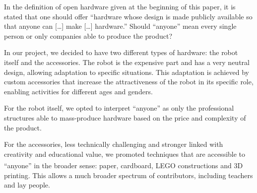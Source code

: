 \documentclass[letterpaper, 10 pt, conference]{ieeeconf}  %
\begin{document}
In the definition of open hardware given at the beginning of this paper, it is stated that one should offer ``hardware whose design is made publicly available so that anyone can [\dots] make [\dots] hardware.''
Should ``anyone'' mean every single person or only companies able to produce the product?

In our project, we decided to have two different types of hardware: the robot itself and the accessories. %
The robot is the expensive part and has a very neutral design, allowing adaptation to specific situations.
This adaptation is achieved by custom accessories that increase the attractiveness of the robot in its specific role, enabling activities for different ages and genders.

For the robot itself, we opted to interpret ``anyone'' as only the professional structures able to mass-produce hardware based on the price and complexity of the product. 

For the accessories, less technically challenging and stronger linked with creativity and educational value, we promoted techniques that are accessible to ``anyone'' in the broader sense: paper, cardboard, LEGO\textsuperscript{\textregistered} constructions and 3D printing. %
This allows a much broader spectrum of contributors, including teachers and lay people.
\end{document}
